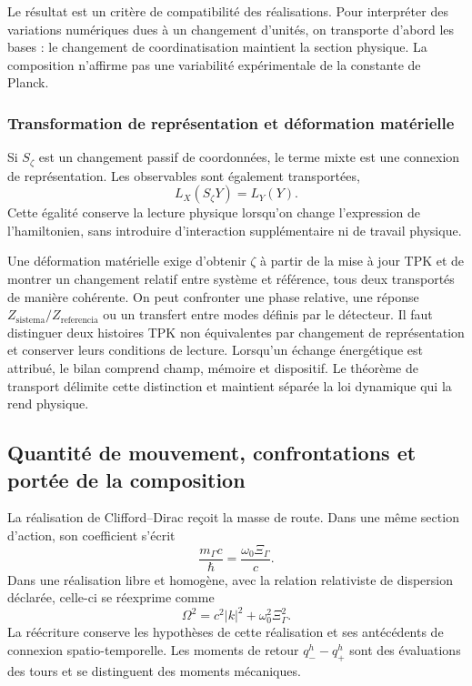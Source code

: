 Le résultat est un critère de compatibilité des réalisations. Pour
interpréter des variations numériques dues à un changement d’unités, on
transporte d’abord les bases : le changement de coordinatisation maintient la section
physique. La composition n’affirme pas une variabilité expérimentale de la
constante de Planck.

\subsubsection{Transformation de représentation et déformation matérielle}
\label{md:hib:interpretacion-transporte}

Si $S_\zeta$ est un changement passif de coordonnées, le terme mixte est une
connexion de représentation. Les observables sont également transportées,
\begin{equation}
 L_X(S_\zeta Y)=L_Y(Y).
 \label{md:hib:observables-transportados}
\end{equation}
Cette égalité conserve la lecture physique lorsqu’on change l’expression de
l’hamiltonien, sans introduire d’interaction supplémentaire ni de travail physique.

Une déformation matérielle exige d’obtenir $\zeta$ à partir de la mise à jour TPK et
de montrer un changement relatif entre système et référence, tous deux transportés
de manière cohérente. On peut confronter une phase relative, une réponse
$Z_{\mathrm{sistema}}/Z_{\mathrm{referencia}}$ ou un transfert entre
modes définis par le détecteur. Il faut distinguer deux histoires TPK non
équivalentes par changement de représentation et conserver leurs conditions de
lecture. Lorsqu’un échange énergétique est attribué, le bilan comprend
champ, mémoire et dispositif. Le théorème de transport délimite cette
distinction et maintient séparée la loi dynamique qui la rend physique.

\subsection{Quantité de mouvement, confrontations et portée de la composition}
\label{md:hib:momento}

La réalisation de Clifford--Dirac reçoit la masse de route. Dans une même
section d’action, son coefficient s’écrit
\begin{equation}
 \frac{m_\Gamma c}{\hbar}
 =\frac{\omega_0\Xi_\Gamma}{c}.
 \label{md:hib:coeficiente-dirac}
\end{equation}
Dans une réalisation libre et homogène, avec la relation relativiste de
dispersion déclarée, celle-ci se réexprime comme
\begin{equation}
 \Omega^2=c^2|k|^2+\omega_0^2\Xi_\Gamma^2.
 \label{md:hib:dispersion}
\end{equation}
La réécriture conserve les hypothèses de cette réalisation et ses antécédents
de connexion spatio-temporelle. Les moments de retour $q_-^h-q_+^h$
sont des évaluations des tours et se distinguent des moments mécaniques.

